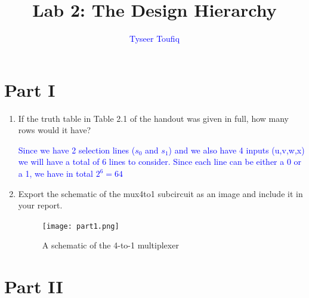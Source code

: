 \documentclass{article}
\title{Lab 2: The Design Hierarchy}
\author{\textcolor{blue}{Tyseer Toufiq}}
\begin{document}
\maketitle

\section*{Part I}

\begin{enumerate}
\item If the truth table in Table 2.1 of the handout was given in full, how many rows would it have?

\textcolor{blue}{Since we have 2 selection lines ($s_0$ and $s_1$) and we also have 4 inputs (u,v,w,x) we will have a total of 6 lines to consider. Since each line can be either a 0 or a 1, we have in total $2^6 = 64$ }

\item Export the schematic of the mux4to1 subcircuit as an image and include it in your report.

\begin{figure}[ht!]
    \centering
    \texttt{[image: part1.png]}
    \caption{A schematic of the 4-to-1 multiplexer}
    \label{f:part1}
\end{figure}
\end{enumerate}

\section*{Part II}
\end{document}

